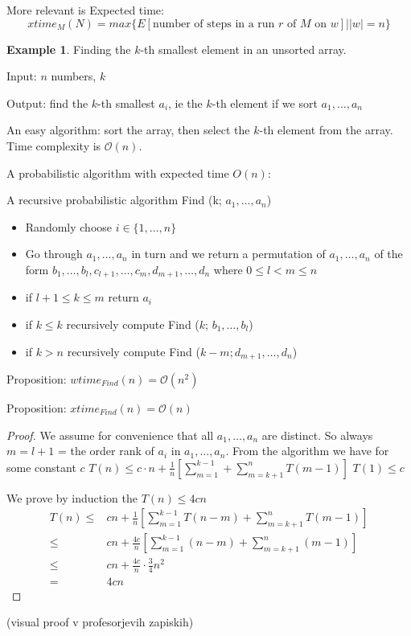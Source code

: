 \documentclass[a4paper,12pt]{article}
\theoremstyle{definition}
\newtheorem{example}[counter]{Example}
\theoremstyle{remark}
\begin{document}
More relevant is Expected time:
\begin{equation*}
    xtime_M(N) = max \{E[\text{number of steps in a run } r \text{ of } M \text{ on } w]| |w| = n\}
\end{equation*}

\begin{example}
    Finding the $k$-th smallest element in an unsorted array.

    Input: $n$ numbers, $k$

    Output: find the $k$-th smallest $a_i$, ie the $k$-th element if we sort $a_1, \dots, a_n$

    An easy algorithm: sort the array, then select the $k$-th element from the array. Time complexity is $\mathscr{O}(n)$.

    A probabilistic algorithm with expected time $O(n)$:

    A recursive probabilistic algorithm Find (k; $a_1, \dots, a_n$)
    \begin{itemize}
        \item Randomly choose $i \in \{1, \dots, n\}$
        \item Go through $a_1, \dots, a_n$ in turn and we return a permutation of $a_1, \dots, a_n$ of the form 
        $b_1, \dots, b_l, c_{l+1}, \dots, c_m, d_{m+1}, \dots, d_n$ where $0 \leq l < m \leq n$
        \item if $l + 1 \leq k \leq m$ return $a_i$
        \item if $k \leq k$ recursively compute Find ($k$; $b_1, \dots, b_l$)
        \item if $k > n$ recursively compute Find ($k-m; d_{m+1}, \dots, d_n$) 
    \end{itemize}

    Proposition: $wtime_{Find}(n) = \mathscr{O}(n^2)$

    Proposition: $xtime_{Find}(n) = \mathscr{O}(n)$

    \begin{proof}
        We assume for convenience that all $a_1, \dots, a_n$ are distinct.
        So always $m = l + 1$ = the order rank of $a_i$ in $a_1, \dots, a_n$.
        From the algorithm we have for some constant $c$
        $T(n) \leq c \cdot n + \frac{1}{n}[\sum_{m = 1}^{k-1} + \sum_{m = k + 1}^{n} T(m-1)]$
        $T(1) \leq c$

        We prove by induction the $T(n) \leq 4 c n$
        \begin{align*}
            T(n) \leq& cn + \frac{1}{n} [\sum_{m=1}^{k-1} T(n-m) + \sum_{m = k + 1}^{n} T(m-1)] \\
                 \leq& cn + \frac{4c}{n} [\sum_{m=1}^{k-1} (n-m) + \sum_{m = k + 1}^{n} (m-1)] \\
                 \leq& cn + \frac{4c}{n} \cdot \frac{3}{4} n^2 \\
                 =& 4cn 
        \end{align*}
    \end{proof}

    (visual proof v profesorjevih zapiskih)

\end{example}
\end{document}
